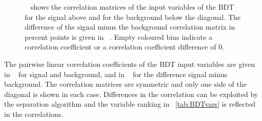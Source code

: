 %
\begin{figure}[tbp!]
\centering
{}
%
\caption[Correlation of input variables of the \gls{BDT}]{
%
\Fig~ shows the correlation matrices of the input variables of the \gls{BDT} for the signal above and for the background below the diagonal. The difference of the signal minus the background correlation matrix in percent points is given in \fig~. Empty coloured bins indicate a correlation coefficient or a correlation coefficient difference of 0. 
%
\label{fig:bdtvarcorr}}
\end{figure}
%
The pairwise linear correlation coefficients of the \gls{BDT} input variables are given in \fig~ for signal and background, and in \fig~ for the difference signal minus background. The correlation matrices are symmetric and only one side of the diagonal is shown in each case. Differences in the correlation can be exploited by the separation algorithm and the variable ranking in \tab~\ref{tab:BDTvars} is reflected in the correlations.
